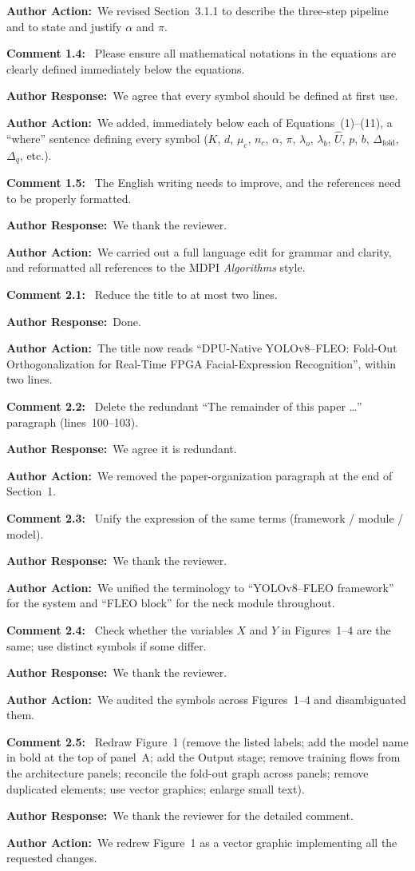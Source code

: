 \documentclass[11pt]{article}
\newcommand{\comment}[1]{\smallskip\noindent\textbf{\color{navy}Comment #1:}\ }
\newcommand{\response}{\smallskip\par\noindent\textbf{\color{steel}Author Response:}\ }
\newcommand{\action}{\smallskip\par\noindent\textbf{\color{steel}Author Action:}\ }
\newcommand{\rev}[1]{\medskip\par\noindent{\large\bfseries\color{navy}#1}\par\smallskip}
\begin{document}
\action We revised Section~3.1.1 to describe the three-step pipeline and to state and justify
$\alpha$ and $\pi$.

\comment{1.4} Please ensure all mathematical notations in the equations are clearly defined
immediately below the equations.

\response We agree that every symbol should be defined at first use.

\action We added, immediately below each of Equations~(1)--(11), a ``where'' sentence defining
every symbol ($K$, $d$, $\mu_c$, $n_c$, $\alpha$, $\pi$, $\lambda_o$, $\lambda_b$,
$\hat{U}$, $p$, $b$, $\Delta_{\text{fold}}$, $\Delta_q$, etc.).

\comment{1.5} The English writing needs to improve, and the references need to be properly
formatted.

\response We thank the reviewer.

\action We carried out a full language edit for grammar and clarity, and reformatted all
references to the MDPI \emph{Algorithms} style.

\rev{Reviewer 2}

\comment{2.1} Reduce the title to at most two lines.
\response Done.
\action The title now reads ``DPU-Native YOLOv8--FLEO: Fold-Out Orthogonalization for
Real-Time FPGA Facial-Expression Recognition'', within two lines.

\comment{2.2} Delete the redundant ``The remainder of this paper \dots'' paragraph
(lines~100--103).
\response We agree it is redundant.
\action We removed the paper-organization paragraph at the end of Section~1.

\comment{2.3} Unify the expression of the same terms (framework / module / model).
\response We thank the reviewer.
\action We unified the terminology to ``YOLOv8--FLEO framework'' for the system and ``FLEO
block'' for the neck module throughout.

\comment{2.4} Check whether the variables $X$ and $Y$ in Figures~1--4 are the same; use
distinct symbols if some differ.
\response We thank the reviewer.
\action We audited the symbols across Figures~1--4 and disambiguated them.

\comment{2.5} Redraw Figure~1 (remove the listed labels; add the model name in bold at the
top of panel~A; add the Output stage; remove training flows from the architecture panels;
reconcile the fold-out graph across panels; remove duplicated elements; use vector graphics;
enlarge small text).
\response We thank the reviewer for the detailed comment.
\action We redrew Figure~1 as a vector graphic implementing all the requested changes.
\end{document}
